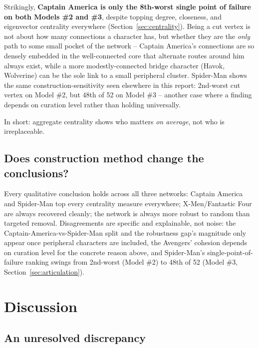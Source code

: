 \documentclass[11pt]{article}
\begin{document}
Strikingly, \textbf{Captain America is only the 8th-worst single point of failure on both Models \#2 and \#3}, despite topping degree, closeness, and eigenvector centrality everywhere (Section~\ref{sec:centrality}). Being a cut vertex is not about how many connections a character has, but whether they are the \emph{only} path to some small pocket of the network -- Captain America's connections are so densely embedded in the well-connected core that alternate routes around him always exist, while a more modestly-connected bridge character (Havok, Wolverine) can be the sole link to a small peripheral cluster. Spider-Man shows the same construction-sensitivity seen elsewhere in this report: 2nd-worst cut vertex on Model \#2, but 48th of 52 on Model \#3 -- another case where a finding depends on curation level rather than holding universally.

In short: aggregate centrality shows who matters \emph{on average}, not who is irreplaceable. 


\subsection{Does construction method change the conclusions?}
\label{sec:cross}

Every qualitative conclusion holds across all three networks: Captain America and Spider-Man top every centrality measure everywhere; X-Men/Fantastic Four are always recovered cleanly; the network is always more robust to random than targeted removal. Disagreements are specific and explainable, not noise: the Captain-America-vs-Spider-Man split and the robustness gap's magnitude only appear once peripheral characters are included, the Avengers' cohesion depends on curation level for the concrete reason above, and Spider-Man's single-point-of-failure ranking swings from 2nd-worst (Model \#2) to 48th of 52 (Model \#3, Section~\ref{sec:articulation}).

\section{Discussion}
\label{sec:discussion}

\subsection{An unresolved discrepancy}
\end{document}
